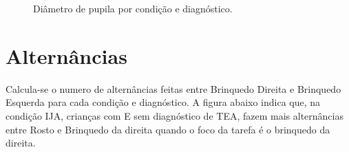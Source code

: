 \documentclass{article}
\begin{document}
\begin{figure}[]
\caption{Diâmetro de pupila por condição e diagnóstico.}
\noindent{}
\centering
\end{figure}

\section{Alternâncias}

Calcula-se o numero de alternâncias feitas entre Brinquedo Direita e Brinquedo Esquerda para cada condição e diagnóstico. A figura abaixo indica que, na condição IJA, crianças com E sem diagnóstico de TEA, fazem mais alternâncias entre Rosto e Brinquedo da direita quando o foco da tarefa é o brinquedo da direita.
\end{document}
